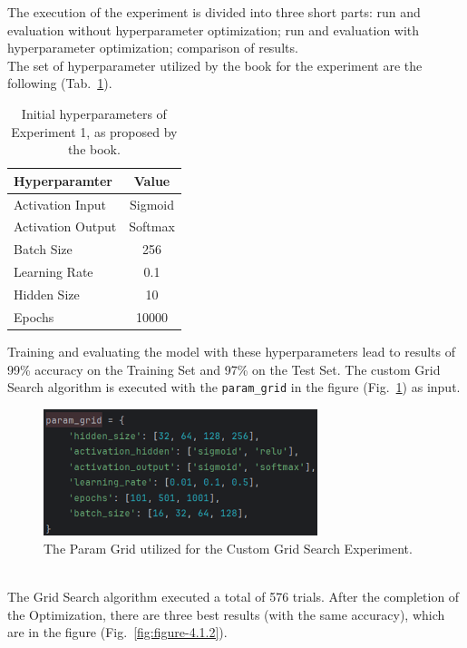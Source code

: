 The execution of the experiment is divided into three short parts: run and evaluation without hyperparameter optimization; run and evaluation with hyperparameter optimization; comparison of results.
\\[0.3cm]The set of hyperparameter utilized by the book for the experiment are the following (Tab.~\ref{tab:table-4.1.1}).
\begin{table}[ht!]
	\center
	\setlength{\tabcolsep}{0.5cm}
	\caption[Initial Hyperparameters of Experiment 1]{Initial hyperparameters of Experiment 1, as proposed by the book.}
	\begin{tabular}{@{}lc@{}}
		\toprule
		\textbf{Hyperparamter} & \textbf{Value} \\ \midrule
		Activation Input       & Sigmoid               \\[0.1cm]
		Activation Output      & Softmax               \\[0.1cm]
		Batch Size             & 256                   \\[0.1cm]
		Learning Rate          & 0.1                   \\[0.1cm]
		Hidden Size            & 10                    \\[0.1cm]
		Epochs                 & 10000                 \\ \bottomrule
	\end{tabular}
	\label{tab:table-4.1.1}
\end{table}
Training and evaluating the model with these hyperparameters lead to results of 99\% accuracy on the Training Set and 97\% on the Test Set.
The custom Grid Search algorithm is executed with the \texttt{param\_grid} in the figure (Fig.~\ref{fig:figure-4.1.1}) as input.
\begin{figure}[t]
	\centering
	\includegraphics[width=8cm]{figures/figure-4.1.1.png}
	\caption[Param Grid for Custom Grid Search Experiment]{The Param Grid utilized for the Custom Grid Search Experiment.}
	\label{fig:figure-4.1.1}
\end{figure}
\\[0.3cm]The Grid Search algorithm executed a total of 576 trials. After the completion of the Optimization, there are three best results (with the same accuracy), which are in the figure (Fig.~\ref{fig:figure-4.1.2}).
